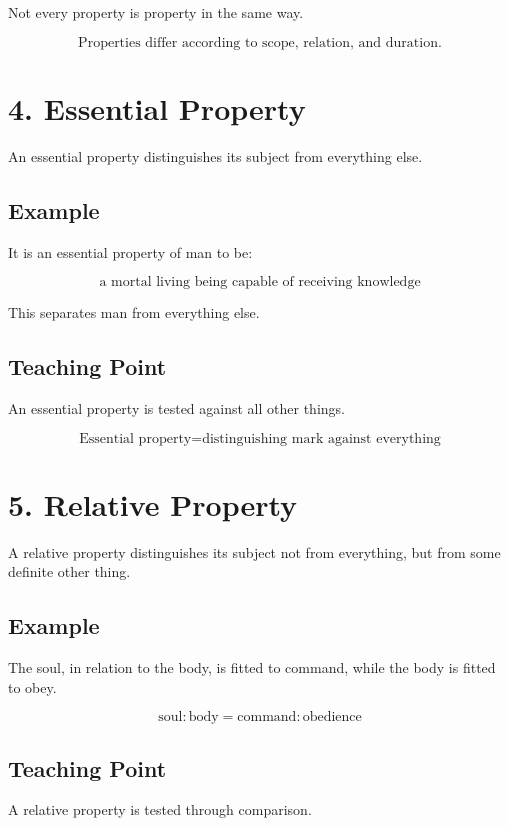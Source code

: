 \documentclass[12pt]{article}
\begin{document}
Not every property is property in the same way.

\[
\boxed{
\text{Properties differ according to scope, relation, and duration.}
}
\]

\section*{4. Essential Property}

An essential property distinguishes its subject from everything else.

\subsection*{Example}

It is an essential property of man to be:

\[
\text{a mortal living being capable of receiving knowledge}
\]

This separates man from everything else.

\subsection*{Teaching Point}

An essential property is tested against all other things.

\[
\boxed{
\text{Essential property} = \text{distinguishing mark against everything}
}
\]

\section*{5. Relative Property}

A relative property distinguishes its subject not from everything, but from some
definite other thing.

\subsection*{Example}

The soul, in relation to the body, is fitted to command, while the body is
fitted to obey.

\[
\text{soul} : \text{body}
=
\text{command} : \text{obedience}
\]

\subsection*{Teaching Point}

A relative property is tested through comparison.
\end{document}
